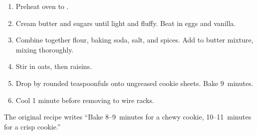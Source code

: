 
\begin{ingredients}
\end{ingredients}


\begin{recipe}
  \begin{enumerate}
  \item Preheat oven to .

  \item Cream butter and sugars until light and fluffy.  Beat in eggs and vanilla.

  \item Combine together flour, baking soda, salt, and spices.  Add
    to butter mixture, mixing thoroughly.

  \item Stir in oats, then raisins.

  \item Drop by rounded teaspoonfuls onto ungreased cookie sheets.
    Bake 9~minutes.

  \item Cool 1 minute before removing to wire racks.

  \end{enumerate}
\end{recipe}

The original recipe writes ``Bake 8--9~minutes for a chewy cookie,
10--11~minutes for a crisp cookie.''
